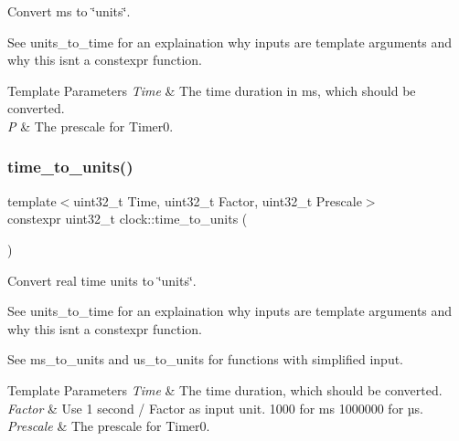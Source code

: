 Convert ms to \char`\"{}units\char`\"{}. 

See units\+\_\+to\+\_\+time for an explaination why inputs are template arguments and why this isn\textquotesingle{}t a constexpr function.


\begin{DoxyTemplParams}{Template Parameters}
{\em Time} & The time duration in ms, which should be converted. \\
\hline
{\em P} & The prescale for {\ttfamily Timer0}. \\
\hline
\end{DoxyTemplParams}
\hypertarget{namespaceclock_ac6b5f264784ea96fd8629fec0c0f7131}{}\label{namespaceclock_ac6b5f264784ea96fd8629fec0c0f7131} 
\subsubsection{\texorpdfstring{time\+\_\+to\+\_\+units()}{time\_to\_units()}}
{\footnotesize\ttfamily template$<$uint32\+\_\+t Time, uint32\+\_\+t Factor, uint32\+\_\+t Prescale$>$ \\
constexpr uint32\+\_\+t clock\+::time\+\_\+to\+\_\+units (\begin{DoxyParamCaption}{ }\end{DoxyParamCaption})}



Convert real time units to \char`\"{}units\char`\"{}. 

See units\+\_\+to\+\_\+time for an explaination why inputs are template arguments and why this isn\textquotesingle{}t a constexpr function.

See ms\+\_\+to\+\_\+units and us\+\_\+to\+\_\+units for functions with simplified input.


\begin{DoxyTemplParams}{Template Parameters}
{\em Time} & The time duration, which should be converted. \\
\hline
{\em Factor} & Use 1 second / Factor as input unit. 1\textquotesingle{}000 for ms 1\textquotesingle{}000\textquotesingle{}000 for µs. \\
\hline
{\em Prescale} & The prescale for {\ttfamily Timer0}. \\
\hline
\end{DoxyTemplParams}
\hypertarget{namespaceclock_a475b3551d89e7a345492a61f70830bd8}{}\label{namespaceclock_a475b3551d89e7a345492a61f70830bd8} 
